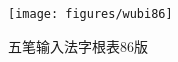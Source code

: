 \documentclass[UTF8, adobefonts, oneside]{ctexbook} \newcommand{\whzkjk}{\kaishu}
\newcommand\milinetwo[3]{\CJKgrid{\kaishu #1\color{gray!20}\whzkjk #1\color{white}\kaishu #1 #2\color{gray!20}\whzkjk #1\color{white}\kaishu #2 #2 #2 #3 #3 #3 #3 } }
\newcommand\miline[1]{\milinetwo{#1}{厂}{水}}
\begin{document}
\begin{figure}[ht]\centering
  \texttt{[image: figures/wubi86]}
  \caption{五笔输入法字根表86版} \label{fig:wubi}
\end{figure}

\clearpage






\end{document}
